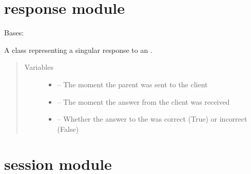 \documentclass[letterpaper,10pt,english]{sphinxmanual}
\begin{document}
\section{response module}
\label{\detokenize{response:module-response}}\label{\detokenize{response::doc}}\label{\detokenize{response:response-module}}

\begin{fulllineitems}
\label{\detokenize{response:response.Response}}
Bases: 

A class representing a singular response to an .
\begin{quote}\begin{description}
\item[{Variables}] \leavevmode\begin{itemize}
\item {} 
 -- The moment the parent  was sent to the client

\item {} 
 -- The moment the answer from the client was received

\item {} 
 -- Whether the answer to the  was correct (True) or incorrect (False)

\end{itemize}

\end{description}\end{quote}

\end{fulllineitems}



\section{session module}
\label{\detokenize{session:module-session}}\label{\detokenize{session::doc}}\label{\detokenize{session:session-module}}
\end{document}
